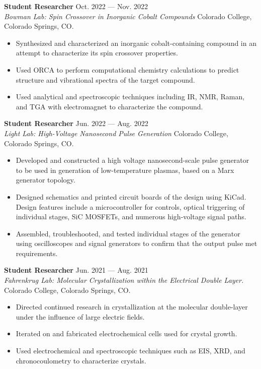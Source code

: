 \documentclass[11pt]{article}
\begin{document}
\noindent
{\bf Student Researcher} \hfill Oct. 2022 --- Nov. 2022 \\
{\sl Bowman Lab: Spin Crossover in Inorganic Cobalt Compounds} Colorado College, Colorado Springs, CO.
\begin{itemize}[topsep=0pt] \itemsep -4pt
\item Synthesized and characterized an inorganic cobalt-containing compound in an attempt to characterize its spin crossover properties.
\item Used ORCA to perform computational chemistry calculations to predict structure and vibrational spectra of the target compound. 
\item Used analytical and spectroscopic techniques including IR, NMR, Raman, and TGA with electromagnet to characterize the compound.
\end{itemize}

\noindent
{\bf Student Researcher} \hfill Jun. 2022 --- Aug. 2022 \\
{\sl Light Lab: High-Voltage Nanosecond Pulse Generation} Colorado College, Colorado Springs, CO.
\begin{itemize}[topsep=0pt] \itemsep -4pt
\item Developed and constructed a high voltage nanosecond-scale pulse generator to be used in generation of low-temperature plasmas, based on a Marx generator topology.
\item Designed schematics and printed circuit boards of the design using KiCad.  Design features include a microcontroller for controls, optical triggering of individual stages, SiC MOSFETs, and numerous high-voltage signal paths.
\item Assembled, troubleshooted, and tested individual stages of the generator using oscilloscopes and signal generators to confirm that the output pulse met requirements. 
\end{itemize}

\noindent
{\bf Student Researcher} \hfill Jun. 2021 --- Aug. 2021 \\
{\sl Fahrenkrug Lab: Molecular Crystallization within the Electrical Double Layer.} Colorado College, Colorado Springs, CO.
\begin{itemize}[topsep=0pt] \itemsep -4pt
\item Directed continued research in crystallization at the molecular double-layer under the influence of large electric fields.
\item Iterated on and fabricated electrochemical cells used for crystal growth.
\item Used electrochemical and spectroscopic techniques such as EIS, XRD, and chronocoulometry to characterize crystals. 
\end{itemize}
\end{document}
